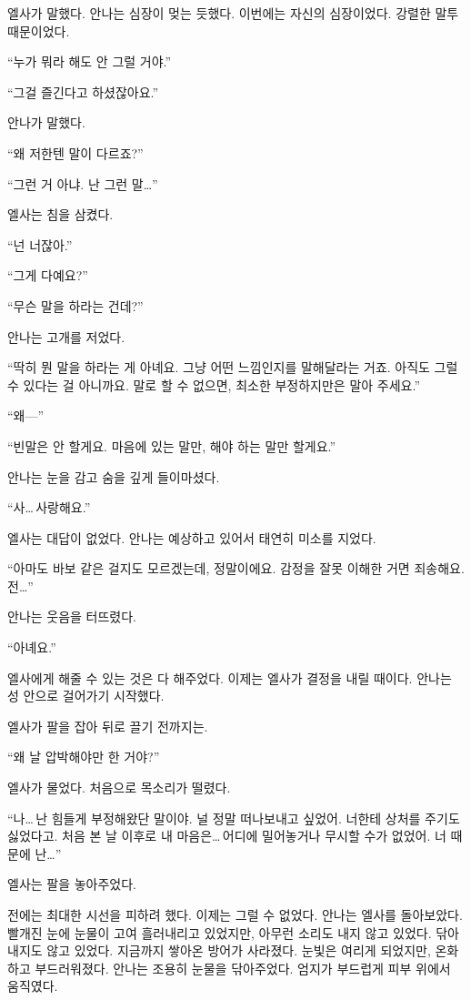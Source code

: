 엘사가 말했다. 안나는 심장이 멎는 듯했다. 이번에는 자신의 심장이었다. 강렬한 말투 때문이었다.

``누가 뭐라 해도 안 그럴 거야.''

``그걸 즐긴다고 하셨잖아요.''

안나가 말했다.

``왜 저한텐 말이 다르죠?''

``그런 거 아냐. 난 그런 말\ldots''

엘사는 침을 삼켰다.

``넌 너잖아.''

``그게 다예요?''

``무슨 말을 하라는 건데?''

안나는 고개를 저었다.

``딱히 뭔 말을 하라는 게 아녜요. 그냥 어떤 느낌인지를 말해달라는 거죠. 아직도 그럴 수 있다는 걸 아니까요. 말로 할 수 없으면, 최소한 부정하지만은 말아 주세요.''

``왜—''

``빈말은 안 할게요. 마음에 있는 말만, 해야 하는 말만 할게요.''

안나는 눈을 감고 숨을 깊게 들이마셨다.

``사\ldots\,사랑해요.''

엘사는 대답이 없었다. 안나는 예상하고 있어서 태연히 미소를 지었다.

``아마도 바보 같은 걸지도 모르겠는데, 정말이에요. 감정을 잘못 이해한 거면 죄송해요. 전\ldots''

안나는 웃음을 터뜨렸다.

``아녜요.''

엘사에게 해줄 수 있는 것은 다 해주었다. 이제는 엘사가 결정을 내릴 때이다. 안나는 성 안으로 걸어가기 시작했다.

엘사가 팔을 잡아 뒤로 끌기 전까지는.

``왜 날 압박해야만 한 거야?''

엘사가 물었다. 처음으로 목소리가 떨렸다.

``나\ldots\,난 힘들게 부정해왔단 말이야. 널 정말 떠나보내고 싶었어. 너한테 상처를 주기도 싫었다고. 처음 본 날 이후로 내 마음은\ldots\,어디에 밀어놓거나 무시할 수가 없었어. 너 때문에 난\ldots''

엘사는 팔을 놓아주었다.

전에는 최대한 시선을 피하려 했다. 이제는 그럴 수 없었다. 안나는 엘사를 돌아보았다. 빨개진 눈에 눈물이 고여 흘러내리고 있었지만, 아무런 소리도 내지 않고 있었다. 닦아내지도 않고 있었다. 지금까지 쌓아온 방어가 사라졌다. 눈빛은 여리게 되었지만, 온화하고 부드러워졌다. 안나는 조용히 눈물을 닦아주었다. 엄지가 부드럽게 피부 위에서 움직였다.


